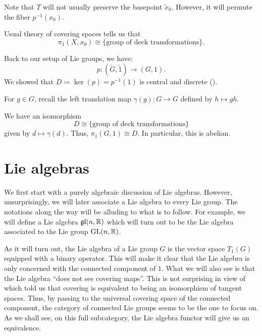\documentclass[12pt]{article}
\begin{document}
Note that $T$ will not usually preserve the basepoint $\widetilde{x}_{0}$. 
However, it will permute the fiber $p^{-1}(x_{0})$.

Usual theory of covering spaces tells us that
\begin{equation*} 
	\pi_{1}(X, x_{0}) \cong \{\text{group of deck transformations}\}.
\end{equation*}

Back to our setup of Lie groups, we have:
\begin{equation*} 
	p \colon (\widetilde{G}, \widetilde{1}) \to (G, 1).
\end{equation*}
We showed that $D \coloneqq \ker(p) = p^{-1}(1)$ is central and discrete (). 

For $g \in G$, recall the left translation map $\gamma(g) \colon G \to G$ defined by $h \mapsto gh$.

\begin{thm} \label{thm:pi-one-kernel-covering}
	We have an isomorphism
	\begin{equation*} 
		D \cong \{\text{group of deck transformations}\}
	\end{equation*}
	given by $d \mapsto \gamma(d)$. \newline
	Thus, $\pi_{1}(G, 1) \cong D$. 
	In particular, this is abelian.
\end{thm}

\section{Lie algebras}

We first start with a purely algebraic discussion of Lie algebras. 
However, unsurprisingly, we will later associate a Lie algebra to every Lie group. 
The notations along the way will be alluding to what is to follow. 
For example, we will define a Lie algebra $\mathfrak{gl}(n, \mathbb{R})$ which will turn out to be the Lie algebra associated to the Lie group $\operatorname{GL}(n, \mathbb{R})$.

As it will turn out, the Lie algebra of a Lie group $G$ is the vector space $T_{1}(G)$ equipped with a binary operator. 
This will make it clear that the Lie algebra is only concerned with the connected component of $1$. 
What we will also see is that the Lie algebra ``does not see covering maps''. 
This is not surprising in view of  which told us that covering is equivalent to being an isomorphism of tangent spaces. 
Thus, by passing to the universal covering space of the connected component, 
the category of connected Lie groups seems to be the one to focus on. 
As we shall see, on this full subcategory, the Lie algebra functor will give us an equivalence.
\end{document}
